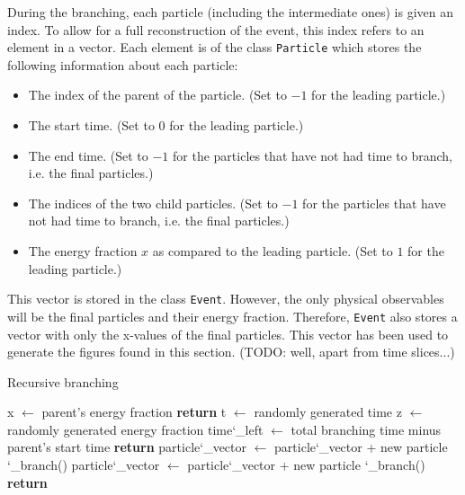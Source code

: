 \documentclass[a4paper,12pt]{article}
\numberwithin{equation}{section}
\begin{document}


During the branching, each particle (including the intermediate ones) is given an index. To allow for a full reconstruction of the event, this index refers to an element in a vector. Each element is of the class {\tt Particle} which stores the following information about each particle:
\begin{itemize}
\item The index of the parent of the particle. (Set to $-1$ for the leading particle.)
\item The start time. (Set to $0$ for the leading particle.)
\item The end time. (Set to $-1$ for the particles that have not had time to branch, i.e. the final particles.)
\item The indices of the two child particles. (Set to $-1$ for the particles that have not had time to branch, i.e. the final particles.)
\item The energy fraction $x$ as compared to the leading particle. (Set to $1$ for the leading particle.)
\end{itemize}
This vector is stored in the class {\tt Event}. However, the only physical observables will be the final particles and their energy fraction. Therefore, {\tt Event} also stores a vector with only the x-values of the final particles. This vector has been used to generate the figures found in this section. (TODO: well, apart from time slices...)


\begin{algorithm}
\caption{Recursive branching}\label{branchingAlg}
\begin{tt}
\begin{algorithmic}[0]
\State x $\gets$ parent's energy fraction
 
\State \textbf{return}
\EndIf
\State t $\gets$ randomly generated time
\State z $\gets$ randomly generated energy fraction
\State time\char`_left $\gets$ total branching time minus parent's start time
 
\State \textbf{return}
\EndIf
\State particle\char`_vector $\gets$ particle\char`_vector + new particle
\State \char`_branch()
\State particle\char`_vector $\gets$ particle\char`_vector + new particle
\State \char`_branch()
\State \textbf{return}
\EndFunction
\end{algorithmic}
\end{tt}
\end{algorithm}
\end{document}
